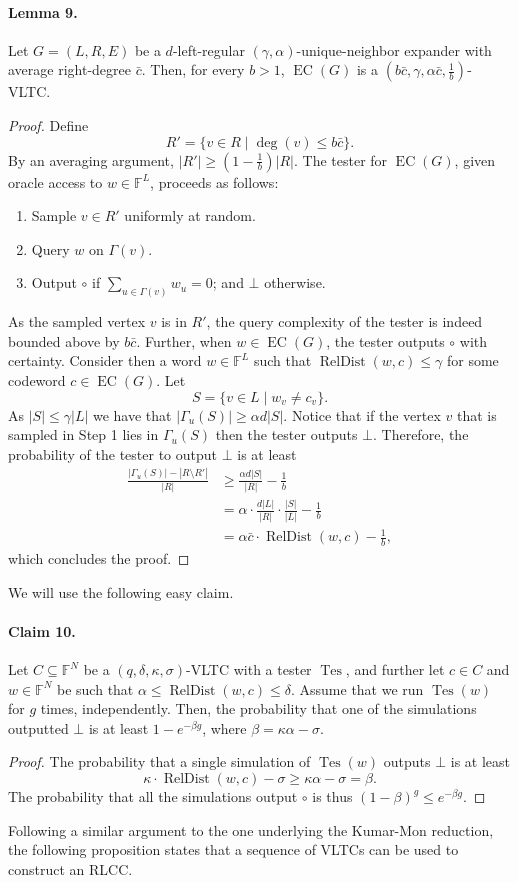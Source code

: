 \documentclass[10pt,a4paper]{article}
\begin{document}
\paragraph{Lemma 9.} Let $G=(L,R,E)$ be a $d$-left-regular $(\gamma,\alpha)$-unique-neighbor expander with average right-degree $\bar c$. Then, for every $b>1$, $\operatorname{EC}(G)$ is a $(b\bar c,\gamma,\alpha\bar c,\frac1b)$-VLTC.
\begin{proof}
Define
\[R'=\{v\in R\mid\deg(v)\le b\bar c\}.\]
By an averaging argument, $|R'|\ge(1-\frac1b)|R|$. The tester for $\operatorname{EC}(G)$, given oracle access to $w\in\mathbb F^L$, proceeds as follows:
\begin{enumerate}\item Sample $v\in R'$ uniformly at random.\item Query $w$ on $\Gamma(v)$.\item Output $\circ$ if $\sum_{u\in\Gamma(v)}w_u=0$; and $\bot$ otherwise.\end{enumerate}
As the sampled vertex $v$ is in $R'$, the query complexity of the tester is indeed bounded above by $b\bar c$. Further, when $w\in\operatorname{EC}(G)$, the tester outputs $\circ$ with certainty.
Consider then a word $w\in\mathbb F^L$ such that $\operatorname{RelDist}(w,c)\le\gamma$ for some codeword $c\in\operatorname{EC}(G)$. Let
\[S=\{v\in L\mid w_v\ne c_v\}.\]
As $|S|\le\gamma|L|$ we have that $|\Gamma_u(S)|\ge\alpha d|S|$. Notice that if the vertex $v$ that is sampled in Step 1 lies in $\Gamma_u(S)$ then the tester outputs $\bot$. Therefore, the probability of the tester to output $\bot$ is at least
\begin{align*}\frac{|\Gamma_u(S)|-|R\setminus R'|}{|R|}&\ge\frac{\alpha d|S|}{|R|}-\frac1b\\&=\alpha\cdot\frac{d|L|}{|R|}\cdot\frac{|S|}{|L|}-\frac1b\\&=\alpha\bar c\cdot\operatorname{RelDist}(w,c)-\frac1b,\end{align*}
which concludes the proof.
\end{proof}
We will use the following easy claim.
\paragraph{Claim 10.} Let $C\subseteq\mathbb F^N$ be a $(q,\delta,\kappa,\sigma)$-VLTC with a tester $\operatorname{Tes}$, and further let $c\in C$ and $w\in\mathbb F^N$ be such that $\alpha\le\operatorname{RelDist}(w,c)\le\delta$. Assume that we run $\operatorname{Tes}(w)$ for $g$ times, independently. Then, the probability that one of the simulations outputted $\bot$ is at least $1-e^{-\beta g}$, where $\beta=\kappa\alpha-\sigma$.
\begin{proof}
The probability that a single simulation of $\operatorname{Tes}(w)$ outputs $\bot$ is at least
\[\kappa\cdot\operatorname{RelDist}(w,c)-\sigma\ge\kappa\alpha-\sigma=\beta.\]
The probability that all the simulations output $\circ$ is thus $(1-\beta)^g\le e^{-\beta g}$.
\end{proof}
Following a similar argument to the one underlying the Kumar-Mon reduction, the following proposition states that a sequence of VLTCs can be used to construct an RLCC.
\end{document}
